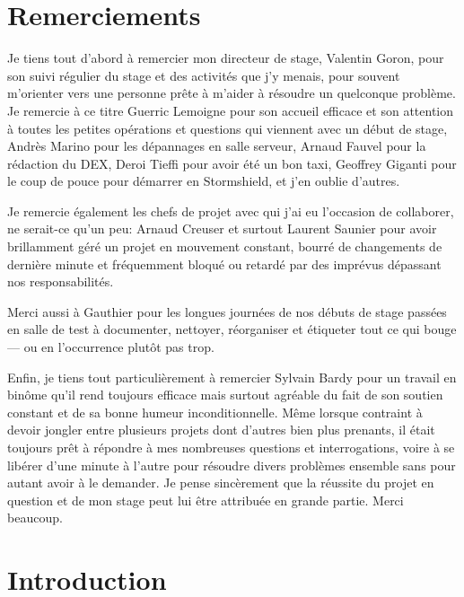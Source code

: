 \documentclass[12pt, oneside, a4paper, titlepage]{report}
\begin{document}
\begin{titlepage}
    
\end{titlepage}

\setcounter{page}{2}
\tableofcontents




\chapter{Remerciements}%
\label{cha:ackn}

Je tiens tout d'abord à remercier mon directeur de stage, Valentin Goron, pour
son suivi régulier du stage et des activités que j'y menais, pour souvent
m'orienter vers une personne prête à m'aider à résoudre un quelconque problème.
Je remercie à ce titre Guerric Lemoigne pour son accueil efficace et son
attention à toutes les petites opérations et questions qui viennent avec un
début de stage, Andrès Marino pour les dépannages en salle serveur, Arnaud
Fauvel pour la rédaction du DEX, Deroi Tieffi pour avoir été un bon taxi,
Geoffrey Giganti pour le coup de pouce pour démarrer en Stormshield, et j'en
oublie d'autres.

Je remercie également les chefs de projet avec qui j'ai eu l'occasion de
collaborer, ne serait-ce qu'un peu: Arnaud Creuser et surtout Laurent Saunier
pour avoir brillamment géré un projet en mouvement constant, bourré de
changements de dernière minute et fréquemment bloqué ou retardé par des imprévus
dépassant nos responsabilités.

Merci aussi à Gauthier pour les longues journées de nos débuts de stage passées
en salle de test à documenter, nettoyer, réorganiser et étiqueter tout ce qui
bouge --- ou en l'occurrence plutôt pas trop.

Enfin, je tiens tout particulièrement à remercier Sylvain Bardy pour un travail
en binôme qu'il rend toujours efficace mais surtout agréable du fait de son
soutien constant et de sa bonne humeur inconditionnelle. Même lorsque contraint
à devoir jongler entre plusieurs projets dont d'autres bien plus prenants, il
était toujours prêt à répondre à mes nombreuses questions et interrogations,
voire à se libérer d'une minute à l'autre pour résoudre divers problèmes
ensemble sans pour autant avoir à le demander. Je pense sincèrement que la
réussite du projet en question et de mon stage peut lui être attribuée en grande
partie. Merci beaucoup.


\chapter{Introduction}%
\label{cha:intro}
\end{document}
